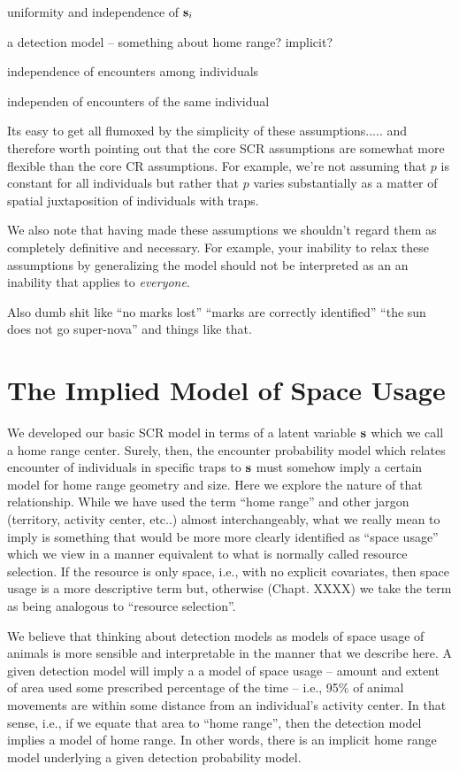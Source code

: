 uniformity and independence of ${\bf s}_{i}$

a detection model -- something about home range?  implicit?

independence of encounters among individuals

independen of encounters of the same individual

Its easy to get all flumoxed  by the simplicity of these
assumptions..... and therefore worth 
pointing out that the core SCR assumptions are somewhat more
flexible than the core CR assumptions. For example, we're not assuming
that $p$ is constant for all individuals but rather that $p$ varies
substantially as a matter of spatial juxtaposition of individuals with
traps.

We also note that having made these assumptions we shouldn't regard
them as completely definitive and necessary. For example, your inability to relax these
assumptions by generalizing the model should not be interpreted as
an an inability that applies to {\it everyone}.

Also dumb shit like ``no marks lost'' ``marks are correctly
identified''
``the sun does not go super-nova'' and things like that.


\section{The Implied Model of Space Usage}
\label{sec.scr0.implied}

We developed our basic SCR model in terms of a latent variable ${\bf
  s}$ which we call a home range center.  Surely, then, the encounter
probability model which relates encounter of individuals in specific
traps to ${\bf s}$ must somehow imply a certain model for home range
geometry and size.  Here we explore the nature of that relationship.  While we
have used the term ``home range'' and other jargon (territory,
activity center, etc..) almost interchangeably, what we really mean to
imply is something that would be more more clearly identified as
``space usage'' which we view in a manner equivalent to what is
normally called resource selection. If the resource is only space,
i.e., with no explicit covariates, then space usage is a more
descriptive term but, otherwise (Chapt. XXXX) we take the term as
being analogous to ``resource selection''.

We believe that thinking about detection models as models of
space usage of animals is more sensible and interpretable in the manner
that we describe here.  A given detection model will imply a a model
of space usage -- amount and extent of area used some prescribed
percentage of the time -- i.e., 95\% of animal movements are within
some distance from an individual's activity center. 
In that sense, i.e., if we equate that area to ``home
range'', then the detection model implies a model of home range. In
other words, there is an implicit home range model underlying a given
detection probability model. 

